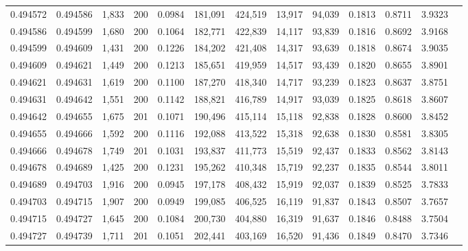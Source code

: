 \begin{tabular}{rrrrrrrrrrrrr}
0.494572 & 0.494586 & 1,833 & 200 &                                     0.0984 & 181,091 & 424,519 &  13,917 &  94,039 & 0.1813 & 0.8711 & 3.9323 \\
0.494586 & 0.494599 & 1,680 & 200 &                                     0.1064 & 182,771 & 422,839 &  14,117 &  93,839 & 0.1816 & 0.8692 & 3.9168 \\
0.494599 & 0.494609 & 1,431 & 200 &                                     0.1226 & 184,202 & 421,408 &  14,317 &  93,639 & 0.1818 & 0.8674 & 3.9035 \\
0.494609 & 0.494621 & 1,449 & 200 &                                     0.1213 & 185,651 & 419,959 &  14,517 &  93,439 & 0.1820 & 0.8655 & 3.8901 \\
0.494621 & 0.494631 & 1,619 & 200 &                                     0.1100 & 187,270 & 418,340 &  14,717 &  93,239 & 0.1823 & 0.8637 & 3.8751 \\
0.494631 & 0.494642 & 1,551 & 200 &                                     0.1142 & 188,821 & 416,789 &  14,917 &  93,039 & 0.1825 & 0.8618 & 3.8607 \\
0.494642 & 0.494655 & 1,675 & 201 &                                     0.1071 & 190,496 & 415,114 &  15,118 &  92,838 & 0.1828 & 0.8600 & 3.8452 \\
0.494655 & 0.494666 & 1,592 & 200 &                                     0.1116 & 192,088 & 413,522 &  15,318 &  92,638 & 0.1830 & 0.8581 & 3.8305 \\
0.494666 & 0.494678 & 1,749 & 201 &                                     0.1031 & 193,837 & 411,773 &  15,519 &  92,437 & 0.1833 & 0.8562 & 3.8143 \\
0.494678 & 0.494689 & 1,425 & 200 &                                     0.1231 & 195,262 & 410,348 &  15,719 &  92,237 & 0.1835 & 0.8544 & 3.8011 \\
0.494689 & 0.494703 & 1,916 & 200 &                                     0.0945 & 197,178 & 408,432 &  15,919 &  92,037 & 0.1839 & 0.8525 & 3.7833 \\
0.494703 & 0.494715 & 1,907 & 200 &                                     0.0949 & 199,085 & 406,525 &  16,119 &  91,837 & 0.1843 & 0.8507 & 3.7657 \\
0.494715 & 0.494727 & 1,645 & 200 &                                     0.1084 & 200,730 & 404,880 &  16,319 &  91,637 & 0.1846 & 0.8488 & 3.7504 \\
0.494727 & 0.494739 & 1,711 & 201 &                                     0.1051 & 202,441 & 403,169 &  16,520 &  91,436 & 0.1849 & 0.8470 & 3.7346 \\

\end{tabular}
